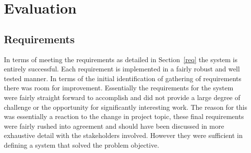 \chapter{Evaluation}






\section{Requirements}

In terms of meeting the requirements as detailed in Section~\ref{req} the system is entirely successful. Each requirement is implemented in a fairly robust and well tested manner. In terms of the initial identification of gathering of requirements there was room for improvement. Essentially the requirements for the system were fairly straight forward to accomplish and did not provide a large degree of challenge or the opportunity for significantly interesting work. The reason for this was essentially a reaction to the change in project topic, these final requirements were fairly rushed into agreement and should have been discussed in more exhaustive detail with the stakeholders involved. However they were sufficient in defining a system that solved the problem objective.




